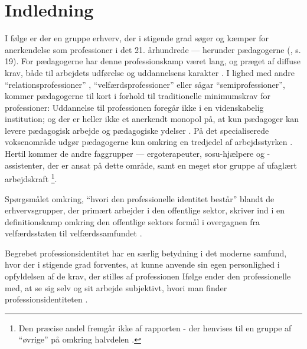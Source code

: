 \section{Indledning}

I følge \citeauthor{hansbolKonstruktionAfProfessionel2008} er der en gruppe erhverv, der i stigende grad søger og kæmper for anerkendelse som professioner i det 21. århundrede — herunder pædagogerne (\citeyear{hansbolKonstruktionAfProfessionel2008}, s. 19).
For pædagogerne har denne professionskamp været lang, og præget af diffuse krav, både til arbejdets udførelse og uddannelsens karakter \autocite[ss. 48-51]{kofodBornepolitikkenOgUdviklingen2007}.
I lighed med andre “relationsprofessioner” \autocite{moosRelationsprofessionerLaererePaedagoger2008}, “velfærdsprofessioner” \autocite{frederiksenVelfaerdsprofessionerMellemOmsorg2017} eller sågar “semiprofessioner”\autocite[s. 54]{kofodBornepolitikkenOgUdviklingen2007}, kommer pædagogerne til kort i forhold til traditionelle minimumskrav for professioner:
Uddannelse til professionen foregår ikke i en videnskabelig institution; og der er heller ikke et anerkendt monopol på, at kun pædagoger kan levere pædagogisk arbejde og pædagogiske ydelser \autocite[s.53]{kofodBornepolitikkenOgUdviklingen2007}.
På det specialiserede voksenområde udgør pædagogerne kun omkring en tredjedel af arbejdsstyrken \autocite[ss. 8-9]{kommunerneslandsforeningFaktaOmKommunernes2019}.
Hertil kommer de andre faggrupper — ergoterapeuter, sosu-hjælpere og -assistenter, der er ansat på dette område, samt en meget stor gruppe af ufaglært arbejdskraft \footnote{Den præcise andel fremgår ikke af rapporten - der henvises til en gruppe af “øvrige” på omkring halvdelen \autocite[s. 8]{kommunerneslandsforeningFaktaOmKommunernes2019}.}.

Spørgsmålet omkring, “hvori den professionelle identitet består” blandt de erhvervsgrupper, der primært arbejder i den offentlige sektor, skriver \citeauthor{hansbolKonstruktionAfProfessionel2008} ind i en definitionskamp omkring den offentlige sektors formål i overgagnen fra velfærdsstaten til velfærdssamfundet \autocite[s. 19]{hansbolKonstruktionAfProfessionel2008}.

Begrebet professionsidentitet har en særlig betydning i det moderne samfund, hvor der i stigende grad forventes, at kunne anvende sin egen personlighed i opfyldelsen af de krav, der stilles af professionen \autocite{hansbolKonstruktionAfProfessionel2008}
Ifølge \citeauthor{mik-meyerIndledningSkabeProfessionel2012} ender den professionelle med, at se sig selv og sit arbejde subjektivt, hvori man finder professionsidentiteten \autocite[s. 458]{mik-meyerIndledningSkabeProfessionel2012}.

